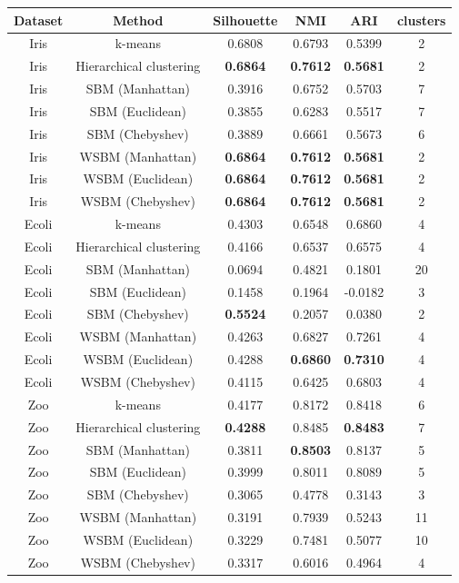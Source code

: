 \documentclass[conference]{IEEEtran}
\begin{document}
\begin{table}[t]
  \centering
  \begin{tabular}{c | c | c c c | c}
    Dataset & Method & Silhouette & NMI & ARI & clusters \\ \hline
    Iris & k-means & 0.6808 & 0.6793 & 0.5399 & 2 \\
    Iris & Hierarchical clustering & \textbf{0.6864} & \textbf{0.7612} & \textbf{0.5681} & 2 \\
    Iris & SBM (Manhattan) & 0.3916 & 0.6752 & 0.5703 & 7 \\
    Iris & SBM (Euclidean) & 0.3855 & 0.6283 & 0.5517 & 7 \\
    Iris & SBM (Chebyshev) & 0.3889 & 0.6661 & 0.5673 & 6 \\
    Iris & WSBM (Manhattan) & \textbf{0.6864} & \textbf{0.7612} & \textbf{0.5681} & 2 \\
    Iris & WSBM (Euclidean) & \textbf{0.6864} & \textbf{0.7612} & \textbf{0.5681} & 2 \\
    Iris & WSBM (Chebyshev) & \textbf{0.6864} & \textbf{0.7612} & \textbf{0.5681} & 2 \\

    \hline
    Ecoli & k-means & 0.4303 & 0.6548 & 0.6860 & 4 \\
    Ecoli & Hierarchical clustering & 0.4166 & 0.6537 & 0.6575 & 4 \\
    Ecoli & SBM (Manhattan) & 0.0694 & 0.4821 & 0.1801 & 20 \\
    Ecoli & SBM (Euclidean) & 0.1458 & 0.1964 & -0.0182 & 3 \\
    Ecoli & SBM (Chebyshev) & \textbf{0.5524} & 0.2057 & 0.0380 & 2 \\
    Ecoli & WSBM (Manhattan) & 0.4263 & 0.6827 & 0.7261 & 4 \\
    Ecoli & WSBM (Euclidean) & 0.4288 & \textbf{0.6860} & \textbf{0.7310} & 4 \\
    Ecoli & WSBM (Chebyshev) & 0.4115 & 0.6425 & 0.6803 & 4 \\

    \hline
    Zoo & k-means & 0.4177 & 0.8172 & 0.8418 & 6 \\
    Zoo & Hierarchical clustering & \textbf{0.4288} & 0.8485 & \textbf{0.8483} & 7 \\
    Zoo & SBM (Manhattan) & 0.3811 & \textbf{0.8503} & 0.8137 & 5 \\
    Zoo & SBM (Euclidean) & 0.3999 & 0.8011 & 0.8089 & 5 \\
    Zoo & SBM (Chebyshev) & 0.3065 & 0.4778 & 0.3143 & 3 \\
    Zoo & WSBM (Manhattan) & 0.3191 & 0.7939 & 0.5243 & 11 \\
    Zoo & WSBM (Euclidean) & 0.3229 & 0.7481 & 0.5077 & 10 \\
    Zoo & WSBM (Chebyshev) & 0.3317 & 0.6016 & 0.4964 & 4 \\


\end{tabular}
\end{table}
\end{document}

